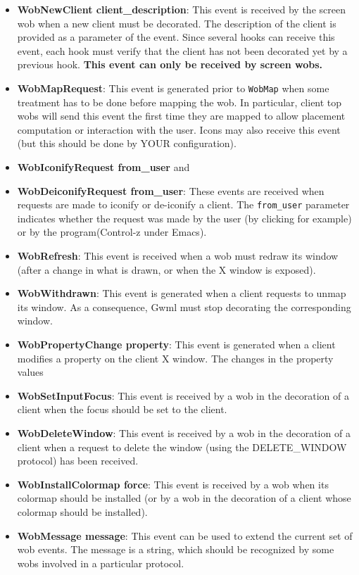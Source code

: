 \documentclass{book}
\begin{document}
\begin{itemize}
\item{\bf WobNewClient client\_description}: This event is received by the
screen wob when a new client must be decorated. The description of the client
is provided as a parameter of the event. Since several hooks can receive 
this event, each hook must verify that the client has not been decorated yet
by a previous hook. {\bf This event can only be received by screen wobs.}

\item{\bf WobMapRequest}: This event is generated prior to {\tt WobMap} when
 some treatment has to be done before mapping the wob. In particular, 
client top  wobs will send this event the first time they are mapped to 
 allow placement computation or interaction with the user. Icons may also
receive this event (but this should be done by YOUR configuration).

 \item{\bf WobIconifyRequest from\_user} and \item{\bf WobDeiconifyRequest
from\_user}: These events are received when requests are made to iconify or
de-iconify a client. The {\tt from\_user} parameter indicates whether the
request was made by the user (by clicking for example) or by the
program(Control-z under Emacs).

\item{\bf WobRefresh}: This event is received when a wob must redraw its
window (after a change in what is drawn, or when the X window is exposed).

\item{\bf WobWithdrawn}: This event is generated when a client requests
  to unmap its window. As a consequence, Gwml must stop decorating the
  corresponding window.

\item{\bf WobPropertyChange property}: This event is generated when a client
  modifies a property on the client X window. The changes in the property 
  values 

\item{\bf WobSetInputFocus}: This event is received by a wob in the 
decoration of a client when the focus should be set to the client.

\item{\bf WobDeleteWindow}: This event is received by a wob in the decoration
of a client when a request to delete the window (using the DELETE\_WINDOW 
protocol) has been received.

\item{\bf WobInstallColormap force}: This event is received by a wob when
its colormap should be installed (or by a wob in the decoration of a client
whose colormap should be installed).

\item{\bf WobMessage message}: This event can be used to extend the current 
set of wob events. The message is a string, which should be recognized by 
some wobs involved in a particular protocol. 
\end{itemize}
\end{document}
